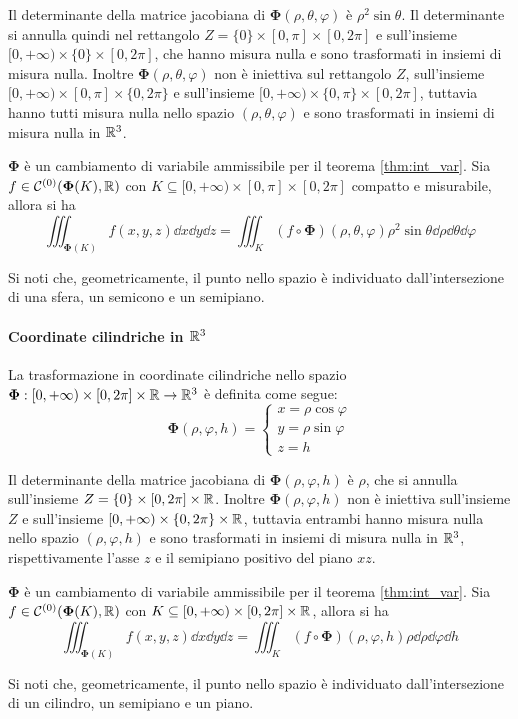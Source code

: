 Il determinante della matrice jacobiana di $\bm\Phi(\rho,\theta,\varphi)$ è $\rho^2\sin\theta$. Il determinante si annulla quindi nel rettangolo $Z=\{0\}\times[0,\pi]\times[0,2\pi]$ e sull'insieme $[0,+\infty)\times\{0\}\times[0,2\pi]$, che hanno misura nulla e sono trasformati in insiemi di misura nulla. Inoltre $\bm\Phi(\rho,\theta,\varphi)$ non è iniettiva sul rettangolo $Z$, sull'insieme $[0,+\infty)\times[0,\pi]\times\{0,2\pi\}$ e sull'insieme $[0,+\infty)\times\{0,\pi\}\times[0,2\pi]$, tuttavia hanno tutti misura nulla nello spazio $(\rho,\theta,\varphi)$ e sono trasformati in insiemi di misura nulla in $\mathbb{R}^3$.

$\bm\Phi$ è un cambiamento di variabile ammissibile per il teorema \ref{thm:int_var}. Sia $f \in \mathcal{C}^{(0)}(\bm\Phi(K),\mathbb{R})$ con $K\subseteq[0,+\infty)\times[0,\pi]\times[0,2\pi]$ compatto e misurabile, allora si ha
$$\iiint_{\bm\Phi(K)}f(x,y,z)\dd x \dd y \dd z=\iiint_K(f\circ\bm\Phi)(\rho,\theta,\varphi)\rho^2\sin\theta  \dd \rho \dd \theta \dd \varphi$$

Si noti che, geometricamente, il punto nello spazio è individuato dall'intersezione di una sfera, un semicono e un semipiano.

\paragraph{Coordinate cilindriche in $\mathbb{R}^3$}
La trasformazione in coordinate cilindriche nello spazio $\bm\Phi:[0,+\infty)\times[0,2\pi]\times\mathbb{R}\to\mathbb{R}^3$ è definita come segue:
$$
\bm\Phi(\rho,\varphi,h)=
\begin{cases}
    x=\rho\cos\varphi\\
    y=\rho\sin\varphi\\
    z=h
\end{cases}
$$

Il determinante della matrice jacobiana di $\bm\Phi(\rho,\varphi,h)$ è $\rho$, che si annulla sull'insieme $Z=\{0\}\times[0,2\pi]\times\mathbb{R}$. Inoltre $\bm\Phi(\rho,\varphi,h)$ non è iniettiva sull'insieme $Z$ e sull'insieme $[0,+\infty)\times\{0,2\pi\}\times\mathbb{R}$, tuttavia entrambi hanno misura nulla nello spazio $(\rho,\varphi,h)$ e sono trasformati in insiemi di misura nulla in $\mathbb{R}^3$, rispettivamente l'asse $z$ e il semipiano positivo del piano $xz$.

$\bm\Phi$ è un cambiamento di variabile ammissibile per il teorema \ref{thm:int_var}. Sia $f \in \mathcal{C}^{(0)}(\bm\Phi(K),\mathbb{R})$ con $K \subseteq [0,+\infty)\times[0,2\pi]\times\mathbb{R}$, allora si ha
$$\iiint_{\bm\Phi(K)}f(x,y,z)\dd x \dd y \dd z = \iiint_K (f\circ\bm\Phi)(\rho,\varphi,h)\rho \dd \rho \dd \varphi \dd h$$

Si noti che, geometricamente, il punto nello spazio è individuato dall'intersezione di un cilindro, un semipiano e un piano.